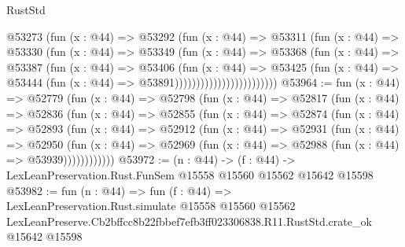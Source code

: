 \begin{lexlean}{RustStd}
\begin{coremodule}
                              @53273
                                (fun (x : @44) =>
                                @53292
                                  (fun (x : @44) =>
                                  @53311
                                    (fun (x : @44) =>
                                    @53330
                                      (fun (x : @44) =>
                                      @53349
                                        (fun (x : @44) =>
                                        @53368
                                          (fun (x : @44) =>
                                          @53387
                                            (fun (x : @44) =>
                                            @53406
                                              (fun (x : @44) =>
                                              @53425
                                                (fun (x : @44) =>
                                                @53444
                                                  (fun (x : @44) => @53891))))))))))))))))))))))))
@53964 := fun (x : @44) =>
  @52779
    (fun (x : @44) =>
    @52798
      (fun (x : @44) =>
      @52817
        (fun (x : @44) =>
        @52836
          (fun (x : @44) =>
          @52855
            (fun (x : @44) =>
            @52874
              (fun (x : @44) =>
              @52893
                (fun (x : @44) =>
                @52912
                  (fun (x : @44) =>
                  @52931
                    (fun (x : @44) =>
                    @52950
                      (fun (x : @44) =>
                      @52969 (fun (x : @44) => @52988 (fun (x : @44) => @53939))))))))))))
@53972 := (n : @44) ->
  (f : @44) -> LexLeanPreservation.Rust.FunSem @15558 @15560 @15562 @15642 @15598
@53982 := fun (n : @44) =>
  fun (f : @44) =>
  LexLeanPreservation.Rust.simulate
    @15558
    @15560
    @15562
    LexLeanPreserve.Cb2bffcc8b22fbbef7efb3ff023306838.R11.RustStd.crate_ok
    @15642
    @15598
\end{coremodule}
\end{lexlean}
